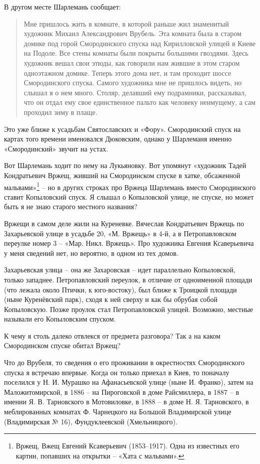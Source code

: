 В другом месте Шарлемань сообщает\cite{sharl01}:

\begin{quotation}
Мне пришлось жить в комнате, в которой раньше жил знаменитый художник Михаил Александрович Врубель. Эта комната была в старом домике под горой Смородинского спуска над Кирилловской улицей в Киеве на Подоле. Все стены комнаты были покрыты большими гвоздями. Здесь художник вешал свои этюды, как говорили нам жившие в этом старом одноэтажном домике. Теперь этого дома нет, и там проходит шоссе Смородинского спуска. Самого художника мне не пришлось видеть, но слышал я о нем много. Столяр, делавший ему подрамники, рассказывал, что он отдал ему свое единственное пальто как человеку неимущему, а сам проходил зиму в плаще.
\end{quotation}

Это уже ближе к усадьбам Святославских и «Фору». Смородинский спуск на картах того времени именовался Дюковским, однако у Шарлеманя именно «Смородинский» звучит на устах.

Вот Шарлемань ходит по нему на Лукьяновку. Вот упомянут «художник Тадей Кондратьевич Вржещ, живший на Смородинском спуске в хатке, обсаженной мальвами»\footnote{Вржещ, Вжещ Евгений Ксаверьевич (1853–1917). Одна из известных его картин, попавших на открытки – «Хата с мальвами».} – но в других строках про Вржеца Шарлемань вместо Смородинского ставит Копыловский спуск. Я слышал о Копыловской улице, не спуске, но может быть я не знаю старого местного названия?

Вржещи в самом деле жили на Куреневке. Вячеслав Кондратьевич Вржещь по Захарьевской улице в усадьбе 20, «М. Вржещь» в 4-й, а в Петропавловском переулке номер 3 – «Мар. Никл. Вржещь». Про художника Евгения Ксаверьевича у меня сведений нет, но вероятно, в одном из тех домов.

Захарьевская улица – она же Захаровская – идет параллельно Копыловской, только западнее. Петропавловский переулок, в отличие от одноименной площади (что лежала около Птички, к юго-востоку), был ближе к Троицкой площади (ныне Куренёвский парк), сходя к ней сверху и как бы обрубая собой Копыловскую. Позже проулок стал Петропавловской улицей. Возможно, местные называли его Копыловским спуском.

К чему я столь далеко отвлекся от предмета разговора? Так а на каком Смородинском спуске обитал Вржещ?

Что до Врубеля, то сведения о его проживании в окрестностях Смородинского спуска я встречаю впервые. Когда он только приехал в Киев, то поначалу поселился у Н. И. Мурашко на Афанасьевской улице (ныне И. Франко), затем на Маложитомирской, в 1886 – на Пироговской в доме Райсмиллера, в 1887 – в имении Я. В. Тарновского в Мотовиловке, в 1888 – в доме Н. Я. Тарновского, в меблированных комнатах Ф. Чарнецкого на Большой Владимирской улице (Владимирская № 16), Фундуклеевской (Хмельницкого).

